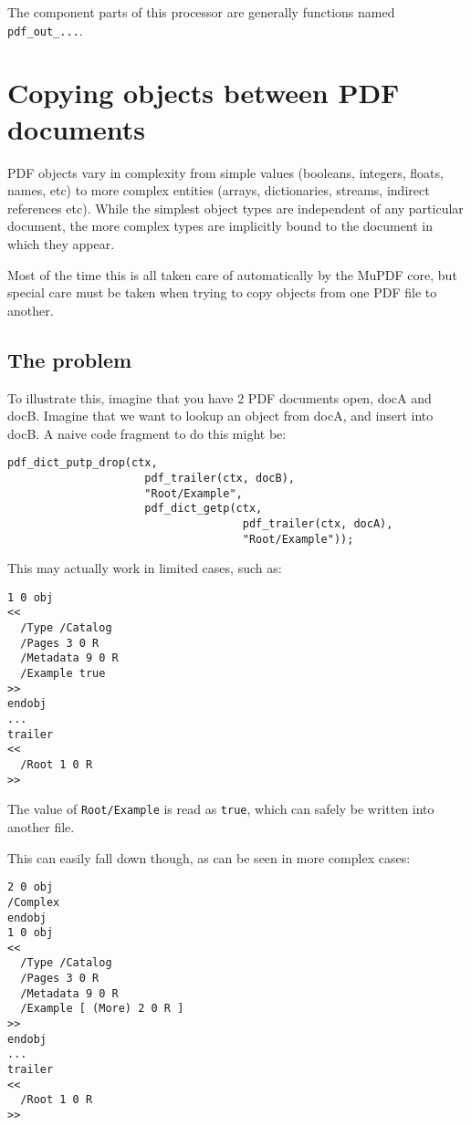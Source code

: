 \documentclass[oneside]{book}
\begin{document}
The component parts of this processor are generally functions named \texttt{pdf\_out\_...}.

\section{Copying objects between PDF documents}

PDF objects vary in complexity from simple values (booleans, integers, floats, names, etc) to more complex entities (arrays, dictionaries, streams, indirect references etc). While the simplest object types are independent of any particular document, the more complex types are implicitly bound to the document in which they appear.

Most of the time this is all taken care of automatically by the MuPDF core, but special care must be taken when trying to copy objects from one PDF file to another.

\subsection{The problem}

To illustrate this, imagine that you have 2 PDF documents open, docA and docB. Imagine that we want to lookup an object from docA, and insert into docB. A naive code fragment to do this might be:

\begin{lstlisting}
pdf_dict_putp_drop(ctx,
                     pdf_trailer(ctx, docB),
                     "Root/Example",
                     pdf_dict_getp(ctx,
                                    pdf_trailer(ctx, docA),
                                    "Root/Example")); 
\end{lstlisting}

This may actually work in limited cases, such as:

\begin{lstlisting}
1 0 obj
<<
  /Type /Catalog
  /Pages 3 0 R
  /Metadata 9 0 R
  /Example true
>>
endobj
...
trailer
<<
  /Root 1 0 R
>>
\end{lstlisting}

The value of \texttt{Root/Example} is read as \texttt{true}, which can safely be written into another file.

This can easily fall down though, as can be seen in more complex cases:

\begin{lstlisting}
2 0 obj
/Complex
endobj
1 0 obj
<<
  /Type /Catalog
  /Pages 3 0 R
  /Metadata 9 0 R
  /Example [ (More) 2 0 R ]
>>
endobj
...
trailer
<<
  /Root 1 0 R
>>
\end{lstlisting}
\end{document}
